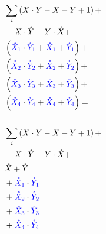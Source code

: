 \documentclass[a4paper]{article}
\newcommand{\Xn}[1]{{\color{blue}\mathring{X}_{#1}}}
\newcommand{\Yn}[1]{{\color{blue}\mathring{Y}_{#1}}}
\begin{document}
\begin{align*}
  &\sum_{i} \left( X \cdot Y - X - Y + 1 \right) + \\
  & - X \cdot \mathring{Y} - Y \cdot \mathring{X} + \\
  &\left( \Xn{1} \cdot \Yn{1} + \Xn{1}  + \Yn{1} \right) + \\
  &\left( \Xn{2} \cdot \Yn{2} + \Xn{2}  + \Yn{2} \right) + \\
  &\left( \Xn{3} \cdot \Yn{3} + \Xn{3}  + \Yn{3} \right) + \\
  &\left( \Xn{4} \cdot \Yn{4} + \Xn{4}  + \Yn{4} \right) = \\
%
  &{} \\
  &\sum_{i} \left( X \cdot Y - X - Y + 1 \right) + \\
  & - X \cdot \mathring{Y} - Y \cdot \mathring{X} + \\
  & \mathring{X} + \mathring{Y} \\
  & + \Xn{1} \cdot \Yn{1} \\
  & + \Xn{2} \cdot \Yn{2} \\
  & + \Xn{3} \cdot \Yn{3} \\
  & + \Xn{4} \cdot \Yn{4}
\end{align*}
\end{document}
